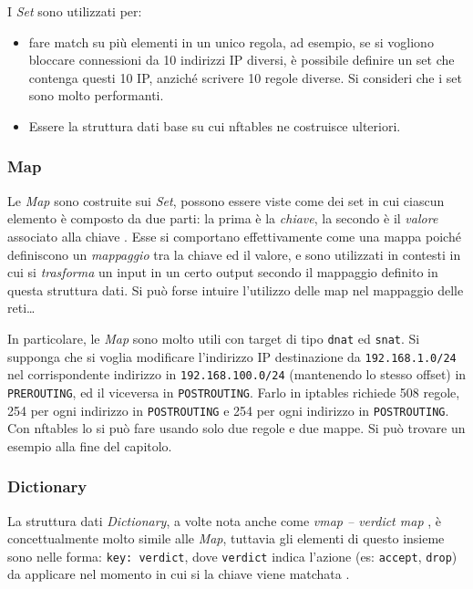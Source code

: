 I \textit{Set} sono utilizzati per:
\begin{itemize}
	\item fare match su più elementi in un unico regola, ad esempio, se si vogliono
	      bloccare connessioni da 10 indirizzi IP diversi, è possibile definire un set
	      che contenga questi 10 IP, anziché scrivere 10 regole diverse. Si consideri che
	      i set sono molto performanti.
	\item Essere la struttura dati base su cui nftables ne costruisce ulteriori.
\end{itemize}


\subsubsection{Map}
Le \textit{Map} sono costruite sui \textit{Set}, possono essere viste come dei set in cui
ciascun elemento è composto da due parti: la prima
è la \textit{chiave}, la secondo è il \textit{valore} associato alla chiave \cite{nftables-maps}. Esse
si comportano effettivamente come una mappa poiché definiscono un \textit{mappaggio}
tra la chiave ed il valore, e sono utilizzati in contesti in cui si \textit{trasforma}
un input in un certo output secondo il mappaggio definito in questa struttura dati.
Si può forse intuire l'utilizzo delle map nel mappaggio delle reti\ldots


In particolare, le \textit{Map} sono molto utili con target di tipo \texttt{dnat} ed \texttt{snat}.
Si supponga che si voglia modificare l'indirizzo IP destinazione da \texttt{192.168.1.0/24}
nel corrispondente indirizzo in \texttt{192.168.100.0/24} (mantenendo lo stesso
offset) in \texttt{PREROUTING}, ed il viceversa in \texttt{POSTROUTING}. Farlo in iptables
richiede 508 regole, 254 per ogni indirizzo in
\texttt{POSTROUTING} e 254 per ogni indirizzo in \texttt{POSTROUTING}. Con nftables
lo si può fare usando solo due regole e due mappe. Si può trovare un esempio alla fine del
capitolo.


\subsubsection{Dictionary}
La struttura dati \textit{Dictionary}, a volte nota anche come \textit{vmap -- verdict map}
, è concettualmente
molto simile alle \textit{Map}, tuttavia gli elementi di questo insieme sono nelle forma:
\texttt{key: verdict}, dove \texttt{verdict} indica l'azione (es: \texttt{accept}, \texttt{drop})
da applicare nel
momento in cui si la chiave viene
matchata \cite{nftables-dictionaries}.

